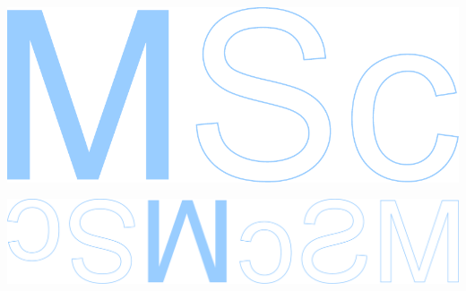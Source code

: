 \documentclass[11pt]{article}
\begin{document}



\begin{flushright}
	\vspace*{\fill}
	\begin{minipage}[b]{54mm}
		\includegraphics[angle=-90,scale=0.97]{msc}
	\end{minipage}
	\vspace*{1mm}
\end{flushright}

\newpage


\begin{flushright}
	\vspace*{\fill}
	\begin{minipage}[b]{54mm}
		\includegraphics[angle=90,scale=0.97]{msc2}
	\end{minipage}
	\vspace*{\fill}
\end{flushright}

\newpage

\end{document}
